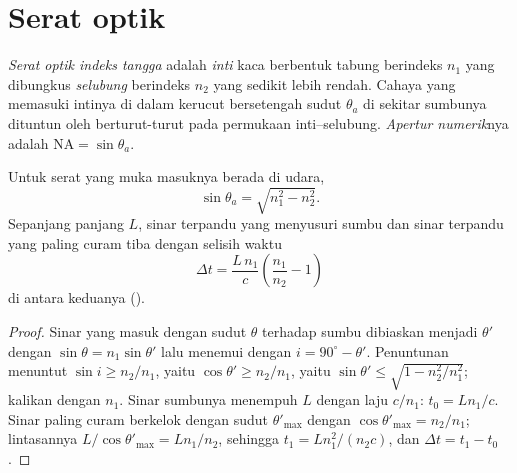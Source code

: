 \section{Serat optik}

\begin{definition}\label{def:b1:rays-reflection-refraction:fiber}
\emph{Serat optik indeks tangga} adalah \emph{inti} kaca berbentuk
tabung berindeks $n_1$ yang dibungkus \emph{selubung} berindeks $n_2$
yang sedikit lebih rendah. Cahaya yang memasuki intinya di dalam kerucut
bersetengah sudut $\theta_a$ di sekitar sumbunya dituntun oleh
 berturut-turut pada permukaan inti--selubung.
\emph{Apertur numerik}nya adalah $\mathrm{NA} = \sin\theta_a$.
\end{definition}

\begin{proposition}\label{prop:b1:rays-reflection-refraction:fiber}
Untuk serat yang muka masuknya berada di udara,
\[
\sin\theta_a = \sqrt{n_1^2 - n_2^2} .
\]
Sepanjang panjang $L$, sinar terpandu yang menyusuri sumbu dan sinar
terpandu yang paling curam tiba dengan selisih waktu
\[
\Delta t = \frac{L\,n_1}{c}\left(\frac{n_1}{n_2} - 1\right)
\]
di antara keduanya (\emph{}).
\end{proposition}

\begin{proof}
Sinar yang masuk dengan sudut $\theta$ terhadap sumbu dibiaskan menjadi
$\theta'$ dengan $\sin\theta = n_1\sin\theta'$ lalu menemui 
dengan  $i = 90^\circ - \theta'$. Penuntunan menuntut
$\sin i \geq n_2/n_1$, yaitu $\cos\theta' \geq n_2/n_1$, yaitu $\sin\theta' \leq
\sqrt{1 - n_2^2/n_1^2}$; kalikan dengan $n_1$. Sinar sumbunya menempuh
$L$ dengan laju $c/n_1$: $t_0 = Ln_1/c$. Sinar paling curam berkelok
dengan sudut $\theta'_{\max}$ dengan $\cos\theta'_{\max} = n_2/n_1$;
lintasannya $L/\cos\theta'_{\max} = L n_1/n_2$, sehingga
$t_1 = L n_1^2/(n_2 c)$, dan $\Delta t = t_1 - t_0$.
\end{proof}

